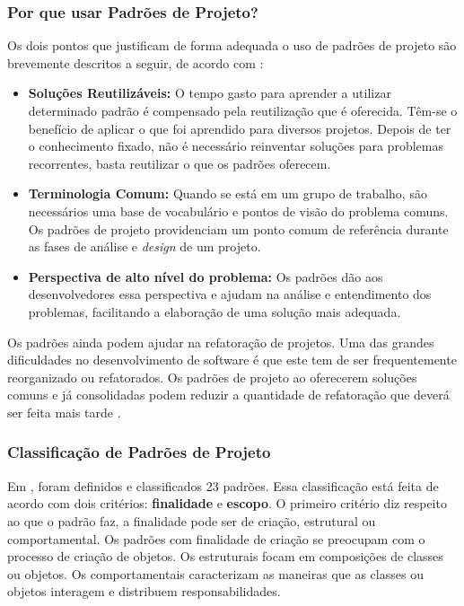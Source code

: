 \subsubsection{Por que usar Padrões de Projeto?}

Os dois pontos que justificam de forma adequada o uso de padrões de projeto são brevemente descritos a seguir, de acordo com \cite{Shalloway:Trott:2004}:

\begin{itemize}
	\item \textbf{Soluções Reutilizáveis:} O tempo gasto para aprender a utilizar determinado padrão é compensado pela reutilização que é oferecida. Têm-se o benefício de aplicar o que foi aprendido para diversos projetos. Depois de ter o conhecimento fixado, não é necessário reinventar soluções para problemas recorrentes, basta reutilizar o que os padrões oferecem.
	\item \textbf{Terminologia Comum:} Quando se está em um grupo de trabalho, são necessários uma base de vocabulário e pontos de visão do problema comuns. Os padrões de projeto providenciam um ponto comum de referência durante as fases de análise e \textit{design} de um projeto.
	\item \textbf{Perspectiva de alto nível do problema:} Os padrões dão aos desenvolvedores essa perspectiva e ajudam na análise e entendimento dos problemas, facilitando a elaboração de uma solução mais adequada.
\end{itemize}

Os padrões ainda podem ajudar na refatoração de projetos. Uma das grandes dificuldades no desenvolvimento de software é que este tem de ser frequentemente reorganizado ou refatorados. Os padrões de projeto ao oferecerem soluções comuns e já consolidadas podem reduzir a quantidade de refatoração que deverá ser feita mais tarde \cite{Gamma:Helm:Johnson:Vlissides:1995}.

\subsubsection{Classificação de Padrões de Projeto}

Em \cite{Gamma:Helm:Johnson:Vlissides:1995}, foram definidos e classificados 23 padrões. Essa classificação está feita de acordo com dois critérios: \textbf{finalidade} e \textbf{escopo}. O primeiro critério diz respeito ao que o padrão faz, a finalidade pode ser de criação, estrutural ou comportamental. Os padrões com finalidade de criação se preocupam com o processo de criação de objetos. Os estruturais focam em composições de classes ou objetos. Os comportamentais caracterizam as maneiras que as classes ou objetos interagem e distribuem responsabilidades.

